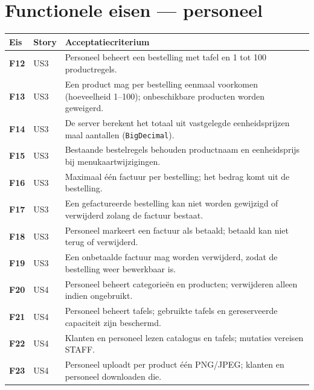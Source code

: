 \documentclass[11pt]{article}
\begin{document}
\section{Functionele eisen --- personeel}
\begin{longtable}{@{}>{\bfseries}p{1.2cm}p{1.6cm}p{11.2cm}@{}}
\toprule
Eis & Story & Acceptatiecriterium \\
\midrule
\endhead
F12 & US3 & Personeel beheert een bestelling met tafel en 1 tot 100 productregels. \\
F13 & US3 & Een product mag per bestelling eenmaal voorkomen (hoeveelheid 1--100); onbeschikbare producten worden geweigerd. \\
F14 & US3 & De server berekent het totaal uit vastgelegde eenheidsprijzen maal aantallen (\texttt{BigDecimal}). \\
F15 & US3 & Bestaande bestelregels behouden productnaam en eenheidsprijs bij menukaartwijzigingen. \\
F16 & US3 & Maximaal één factuur per bestelling; het bedrag komt uit de bestelling. \\
F17 & US3 & Een gefactureerde bestelling kan niet worden gewijzigd of verwijderd zolang de factuur bestaat. \\
F18 & US3 & Personeel markeert een factuur als betaald; betaald kan niet terug of verwijderd. \\
F19 & US3 & Een onbetaalde factuur mag worden verwijderd, zodat de bestelling weer bewerkbaar is. \\
F20 & US4 & Personeel beheert categorieën en producten; verwijderen alleen indien ongebruikt. \\
F21 & US4 & Personeel beheert tafels; gebruikte tafels en gereserveerde capaciteit zijn beschermd. \\
F22 & US4 & Klanten en personeel lezen catalogus en tafels; mutaties vereisen STAFF. \\
F23 & US4 & Personeel uploadt per product één PNG/JPEG; klanten en personeel downloaden die. \\
\bottomrule
\end{longtable}
\end{document}
